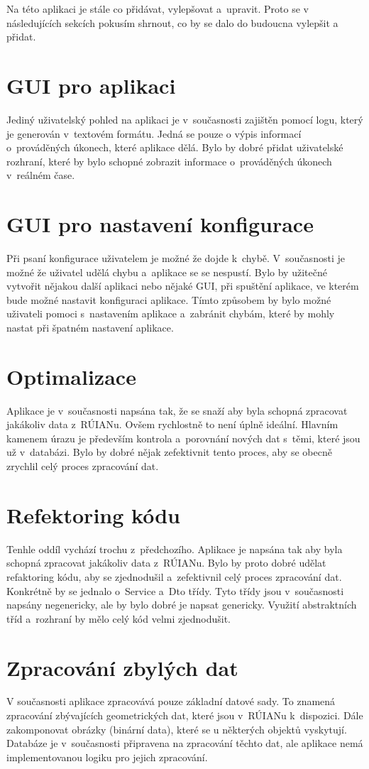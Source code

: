 \label{cha:NavrhDoBudoucna}
Na této aplikaci je stále co přidávat, vylepšovat a~upravit.
Proto se v následujících sekcích pokusím shrnout, co by se 
dalo do budoucna vylepšit a přidat.

\section*{GUI pro aplikaci}
Jediný uživatelský pohled na aplikaci je v~současnosti zajištěn pomocí 
logu, který je generován v~textovém formátu. Jedná se pouze o výpis
informací o~prováděných úkonech, které aplikace dělá.
Bylo by dobré přidat uživatelské rozhraní, které by bylo schopné
zobrazit informace o~prováděných úkonech v~reálném čase.

\section*{GUI pro nastavení konfigurace}
Při psaní konfigurace uživatelem je možné že dojde k~chybě.
V~současnosti je možné že uživatel udělá chybu a~aplikace se 
se nespustí. Bylo by užitečné vytvořit nějakou další aplikaci nebo nějaké GUI,
při spuštění aplikace, ve kterém bude možné nastavit konfiguraci aplikace.
Tímto způsobem by bylo možné uživateli pomoci s~nastavením aplikace
a~zabránit chybám, které by mohly nastat při špatném nastavení aplikace.

\section*{Optimalizace}
Aplikace je v~současnosti napsána tak, že se snaží aby byla schopná
zpracovat jakákoliv data z~RÚIANu. Ovšem rychlostně to není
úplně ideální. Hlavním kamenem úrazu je především kontrola
a~porovnání nových dat s~těmi, které jsou už v~databázi.
Bylo by dobré nějak zefektivnit tento proces, aby se obecně zrychlil
celý proces zpracování dat.

\section*{Refektoring kódu}
Tenhle oddíl vychází trochu z~předchozího. Aplikace je napsána
tak aby byla schopná zpracovat jakákoliv data z~RÚIANu.
Bylo by proto dobré udělat refaktoring kódu, aby se zjednodušil
a~zefektivnil celý proces zpracování dat. Konkrétně by se jednalo
o~Service a~Dto třídy. Tyto třídy jsou v~současnosti napsány
negenericky, ale by bylo dobré je napsat genericky.
Využití abstraktních tříd a~rozhraní by mělo celý kód velmi
zjednodušit.

\section*{Zpracování zbylých dat}
V současnosti aplikace zpracovává pouze základní datové sady.
To znamená zpracování zbývajících geometrických dat, které jsou
v~RÚIANu k~dispozici. Dále zakomponovat obrázky (binární data),
které se u některých objektů vyskytují.
Databáze je v~současnosti připravena na zpracování těchto dat,
ale aplikace nemá implementovanou logiku pro jejich zpracování.